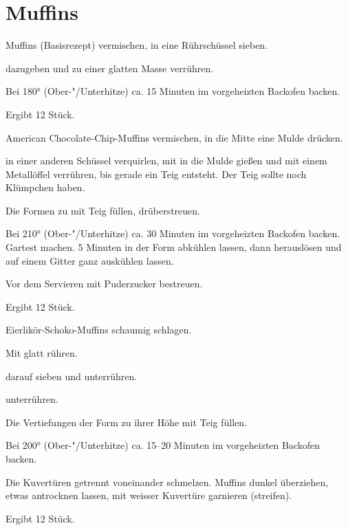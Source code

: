 \section{Muffins}

\begin{recipe}{Muffins (Basisrezept)}
  vermischen, in eine Rührschüssel sieben.
  
  dazugeben und zu einer glatten Masse verrühren.

  Bei 180° (Ober-"/Unterhitze) ca. 15 Minuten im vorgeheizten
  Backofen backen.
  
  Ergibt 12 Stück.
\end{recipe}
  
\begin{recipe}{American Chocolate-Chip-Muffins}
  vermischen, in die Mitte eine Mulde drücken.

  in einer anderen Schüssel verquirlen, mit
  in die Mulde gießen und mit einem Metallöffel verrühren, bis gerade
  ein Teig entsteht. Der Teig sollte noch Klümpchen haben.
  
  Die Formen zu  mit Teig füllen,
  drüberstreuen.

  Bei 210° (Ober-"/Unterhitze) ca. 30 Minuten im vorgeheizten
  Backofen backen. Gartest machen. 5 Minuten in der Form
  abkühlen lassen, dann herauslösen und auf einem Gitter ganz
  auskühlen lassen.

  Vor dem Servieren mit Puderzucker bestreuen.
  
  Ergibt 12 Stück.
\end{recipe}

\begin{recipe}{Eierlikör-Schoko-Muffins}
  schaumig schlagen.

  Mit
  glatt rühren.
  
  darauf sieben und unterrühren.
  
  unterrühren.

  Die Vertiefungen der Form zu  ihrer Höhe mit Teig füllen.
  
  Bei 200° (Ober-"/Unterhitze) ca. 15--20 Minuten im vorgeheizten
  Backofen backen.

  Die Kuvertüren getrennt voneinander schmelzen. Muffins dunkel überziehen,
  etwas antrocknen lassen, mit weisser Kuvertüre garnieren (streifen).

  Ergibt 12 Stück.
\end{recipe}

